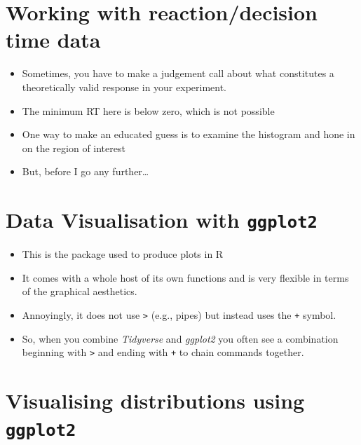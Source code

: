 \documentclass[
]{article}
\providecommand{\tightlist}{%
  \setlength{\itemsep}{0pt}\setlength{\parskip}{0pt}}
\begin{document}
\hypertarget{working-with-reactiondecision-time-data}{%
\section{Working with reaction/decision time
data}\label{working-with-reactiondecision-time-data}}

\begin{itemize}
\tightlist
\item
  Sometimes, you have to make a judgement call about what constitutes a
  theoretically valid response in your experiment.
\item
  The minimum RT here is below zero, which is not possible
\item
  One way to make an educated guess is to examine the histogram and hone
  in on the region of interest
\item
  But, before I go any further\ldots{}
\end{itemize}

\hypertarget{data-visualisation-with-ggplot2}{%
\section{\texorpdfstring{Data Visualisation with
\texttt{ggplot2}}{Data Visualisation with ggplot2}}\label{data-visualisation-with-ggplot2}}

\begin{itemize}
\tightlist
\item
  This is the package used to produce plots in R
\item
  It comes with a whole host of its own functions and is very flexible
  in terms of the graphical aesthetics.
\item
  Annoyingly, it does not use \texttt{\textbar{}\textgreater{}} (e.g.,
  pipes) but instead uses the \texttt{+} symbol.
\item
  So, when you combine \emph{Tidyverse} and \emph{ggplot2} you often see
  a combination beginning with \texttt{\textbar{}\textgreater{}} and
  ending with \texttt{+} to chain commands together.
\end{itemize}

\hypertarget{visualising-distributions-using-ggplot2}{%
\section{\texorpdfstring{Visualising distributions using
\texttt{ggplot2}}{Visualising distributions using ggplot2}}\label{visualising-distributions-using-ggplot2}}
\end{document}

